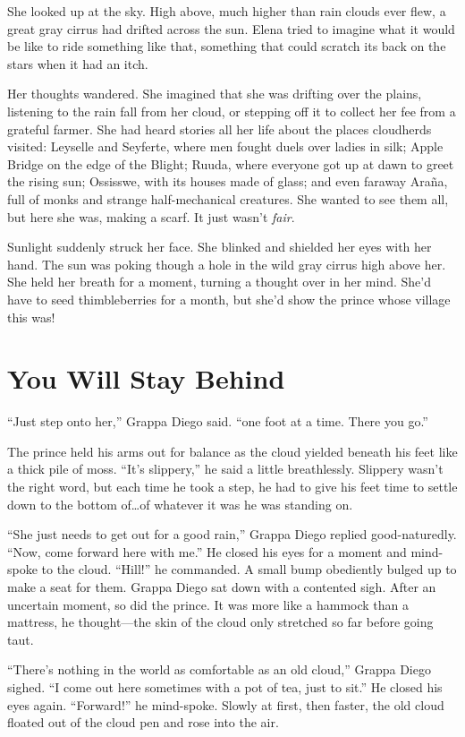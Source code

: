 \documentclass[10pt]{book}
\begin{document}
She looked up at the sky. High above, much higher than rain clouds ever flew, a great gray cirrus had drifted across the sun. Elena tried to imagine what it would be like to ride something like that, something that could scratch its back on the stars when it had an itch.

Her thoughts wandered. She imagined that she was drifting over the plains, listening to the rain fall from her cloud, or stepping off it to collect her fee from a grateful farmer. She had heard stories all her life about the places cloudherds visited: Leyselle and Seyferte, where men fought duels over ladies in silk; Apple Bridge on the edge of the Blight; Ruuda, where everyone got up at dawn to greet the rising sun; Ossisswe, with its houses made of glass; and even faraway Ara\~{n}a, full of monks and strange half-mechanical creatures. She wanted to see them all, but here she was, making a scarf. It just wasn't \emph{fair}.

Sunlight suddenly struck her face. She blinked and shielded her eyes with her hand. The sun was poking though a hole in the wild gray cirrus high above her. She held her breath for a moment, turning a thought over in her mind. She'd have to seed thimbleberries for a month, but she'd show the prince whose village this was!

\chapter{You Will Stay Behind}

``Just step onto her,'' Grappa Diego said.  ``one foot at a time. There you go.''

The prince held his arms out for balance as the cloud yielded beneath his feet like a thick pile of moss. ``It's slippery,'' he said a little breathlessly. Slippery wasn't the right word, but each time he took a step, he had to give his feet time to settle down to the bottom of{\ldots}of whatever it was he was standing on.

``She just needs to get out for a good rain,'' Grappa Diego replied good-naturedly. ``Now, come forward here with me.'' He closed his eyes for a moment and mind-spoke to the cloud. ``Hill!'' he commanded. A small bump obediently bulged up to make a seat for them. Grappa Diego sat down with a contented sigh. After an uncertain moment, so did the prince. It was more like a hammock than a mattress, he thought---the skin of the cloud only stretched so far before going taut.

``There's nothing in the world as comfortable as an old cloud,'' Grappa Diego sighed. ``I come out here sometimes with a pot of tea, just to sit.'' He closed his eyes again. ``Forward!'' he mind-spoke. Slowly at first, then faster, the old cloud floated out of the cloud pen and rose into the air.
\end{document}

